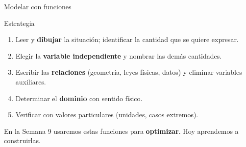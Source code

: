 \documentclass[10pt,aspectratio=169]{beamer}
\begin{document}
\begin{frame}{Modelar con funciones}
  \begin{block}{Estrategia}
    \begin{enumerate}
      \item Leer y \textbf{dibujar} la situación; identificar la cantidad que se quiere expresar.
      \item Elegir la \textbf{variable independiente} y nombrar las demás cantidades.
      \item Escribir las \textbf{relaciones} (geometría, leyes físicas, datos) y eliminar variables auxiliares.
      \item Determinar el \textbf{dominio} con sentido físico.
      \item Verificar con valores particulares (unidades, casos extremos).
    \end{enumerate}
  \end{block}
  \begin{idea}
    En la Semana 9 usaremos estas funciones para \textbf{optimizar}. Hoy aprendemos a construirlas.
  \end{idea}
\end{frame}
\end{document}
